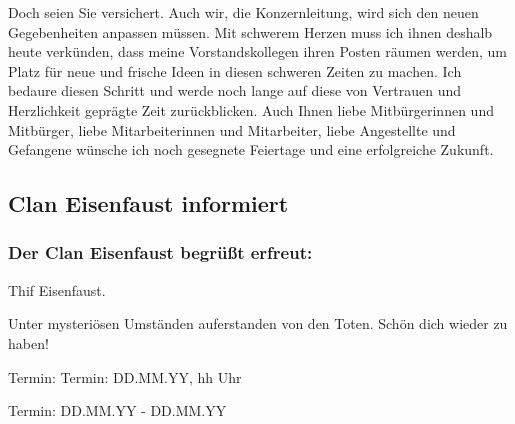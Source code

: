 Doch seien Sie versichert. Auch wir, die Konzernleitung, wird sich den
neuen Gegebenheiten anpassen müssen. Mit schwerem Herzen muss ich ihnen deshalb heute verkünden, dass meine Vorstandskollegen ihren Posten räumen werden, um
Platz für neue und frische Ideen in diesen schweren Zeiten zu machen.
Ich bedaure diesen Schritt und werde noch lange auf diese von Vertrauen
und Herzlichkeit geprägte Zeit zurückblicken.
Auch Ihnen liebe Mitbürgerinnen und Mitbürger, liebe Mitarbeiterinnen
und Mitarbeiter, liebe Angestellte und Gefangene wünsche ich noch
gesegnete Feiertage und eine erfolgreiche Zukunft.

\subsection{Clan Eisenfaust informiert}

\setsubsubsecheadstyle{\centering\bfseries}
\subsubsection{Der Clan Eisenfaust begrüßt erfreut:}

\begin{center}
   Thif Eisenfaust.
\end{center}
\vspace{-0.5em}
Unter mysteriösen Umständen auferstanden von den Toten. Schön dich wieder zu haben!



\begin{termine}
 \item Termin: Termin: DD.MM.YY, hh Uhr
  \item Termin: DD.MM.YY - DD.MM.YY
\end{termine}


